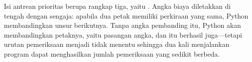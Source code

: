 \begin{tipsbox}
Isi antrean prioritas berupa rangkap tiga, yaitu
. Angka biaya diletakkan di
tengah dengan sengaja: apabila dua petak memiliki perkiraan yang sama, Python
membandingkan unsur berikutnya. Tanpa angka pembanding itu, Python akan
membandingkan petaknya, yaitu pasangan angka, dan itu berhasil juga---tetapi
urutan pemeriksaan menjadi tidak menentu sehingga dua kali menjalankan
program dapat menghasilkan jumlah pemeriksaan yang sedikit berbeda.
\end{tipsbox}
